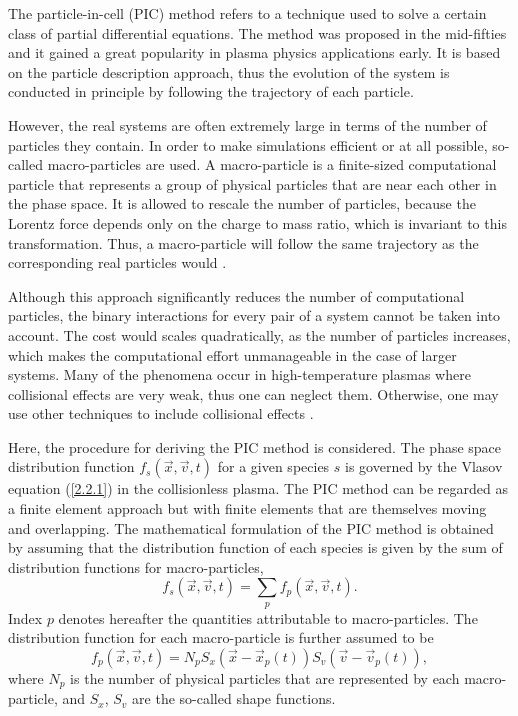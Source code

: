 The particle-in-cell (PIC) method refers to a technique used to solve a certain class of partial differential equations. The method was proposed in the mid-fifties and it gained a great popularity in plasma physics applications early. It is based on the particle description approach, thus the evolution of the system is conducted in principle by following the trajectory of each particle.

However, the real systems are often extremely large in terms of the number of particles they contain. In order to make simulations efficient or at all possible, so-called macro-particles are used. A macro-particle is a finite-sized computational particle that represents a group of physical particles that are near each other in the phase space. It is allowed to rescale the number of particles, because the Lorentz force depends only on the charge to mass ratio, which is invariant to this transformation. Thus, a macro-particle will follow the same trajectory as the corresponding real particles would \cite{hockney}.

Although this approach significantly reduces the number of computational particles, the binary interactions for every pair of a system cannot be taken into account. The cost would scales quadratically, as the number of particles increases, which makes the computational effort unmanageable in the case of larger systems. Many of the phenomena occur in high-temperature plasmas where collisional effects are very weak, thus one can neglect them. Otherwise, one may use other techniques to include collisional effects \cite{lapenta}.

Here, the procedure for deriving the PIC method is considered. The phase space distribution function  $ f_{s} \left(\vec{x}, \vec{v}, t\right) $ for a given species $ s $ is governed by the Vlasov equation (\ref{2.2.1}) in the collisionless plasma. The PIC method can be regarded as a finite element approach but with finite elements that are themselves moving and overlapping. The mathematical formulation of the PIC method is obtained by assuming that the distribution function of each species is given by the sum of distribution functions for macro-particles,
\begin{equation}
\label{3.1.1}
f_{s} \left(\vec{x}, \vec{v}, t \right) =  \sum_{p} f_{p}\left(\vec{x}, \vec{v}, t \right).
\end{equation}
Index $ p $ denotes hereafter the quantities attributable to macro-particles. The distribution function for each macro-particle is further assumed to be
\begin{equation}
\label{3.1.2}
f_{p}\left(\vec{x}, \vec{v}, t \right) = N_{p} S_{x}\left(\vec{x} - \vec{x}_{p}\left(t\right) \right)  S_{v}\left(\vec{v} - \vec{v}_{p}\left( t\right) \right),
\end{equation}
where $ N_{p} $ is the number of physical particles that are represented by each macro-particle, and $ S_{x} $, $ S_{v} $ are the so-called shape functions.

